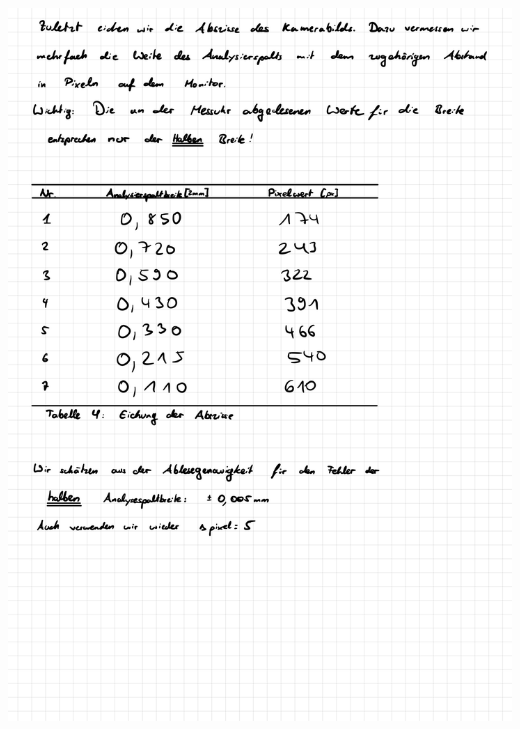 \documentclass{article}
\begin{document}
\includegraphics[width=\textwidth]{graphics/messprotokoll/233 - Fourieroptik-7.jpg}
\newpage
\end{document}
